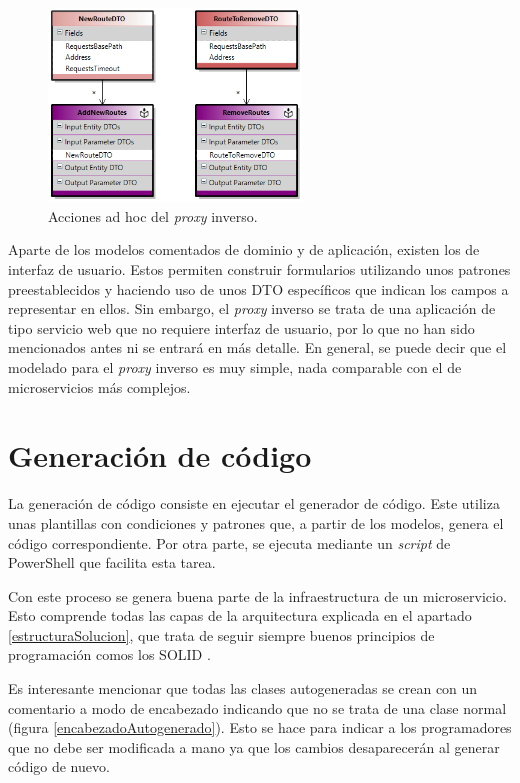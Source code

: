 \documentclass[11pt,spanish,listoffigures]{tfgetsinf}
\begin{document}
\begin{figure}[ht]
\centering
\includegraphics[width=0.6\textwidth]{imagenes/apendice/accionesAdHoc}
\caption{Acciones ad hoc del \emph{proxy} inverso.}
	\label{accionesAdHoc}
\end{figure}

Aparte de los modelos comentados de dominio y de aplicación, existen los de interfaz de usuario. Estos permiten construir formularios utilizando unos patrones preestablecidos y haciendo uso de unos DTO específicos que indican los campos a representar en ellos. Sin embargo, el \emph{proxy} inverso se trata de una aplicación de tipo servicio web que no requiere interfaz de usuario, por lo que no han sido mencionados antes ni se entrará en más detalle. En general, se puede decir que el modelado para el \emph{proxy} inverso es muy simple, nada comparable con el de microservicios más complejos.

	\section{Generación de código}

La generación de código consiste en ejecutar el generador de código. Este utiliza unas plantillas con condiciones y patrones que, a partir de los modelos, genera el código correspondiente. Por otra parte, se ejecuta mediante un \emph{script} de PowerShell \cite{PowerShell} que facilita esta tarea.

Con este proceso se genera buena parte de la infraestructura de un microservicio. Esto comprende todas las capas de la arquitectura explicada en el apartado \ref{estructuraSolucion}, que trata de seguir siempre buenos principios de programación comos los SOLID \cite{SOLID}.

Es interesante mencionar que todas las clases autogeneradas se crean con un comentario a modo de encabezado indicando que no se trata de una clase normal (figura \ref{encabezadoAutogenerado}). Esto se hace para indicar a los programadores que no debe ser modificada a mano ya que los cambios desaparecerán al generar código de nuevo.
\end{document}
